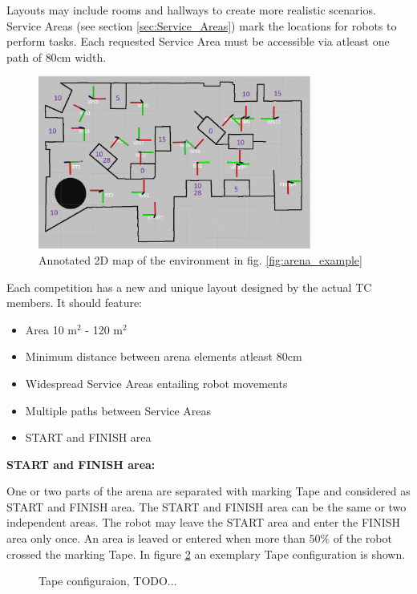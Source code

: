 Layouts may include rooms and hallways to create more realistic scenarios.
Service Areas (see section \ref{sec:Service_Areas}) mark the locations for robots to perform tasks.
Each requested Service Area must be accessible via atleast one path of $80\si{\centi\meter}$ width.

\begin{figure} [h!]
\centering
\includegraphics[width= 0.8\textwidth ]{./images/general_rules/arena_map_annotated}
\caption{Annotated 2D map of the environment in fig. \ref{fig:arena_example}}
\label{fig:arena_map_annotated}
\end{figure}

Each competition has a new and unique layout designed by the actual TC members.
It should feature:
\begin{itemize}
\item Area 10 m$^2$ - 120 m$^2$
\item Minimum distance between arena elements atleast $80\si{\centi\meter}$ 
\item Widespread Service Areas entailing robot movements
\item Multiple paths between Service Areas
\item START and FINISH area
\end{itemize}


\textbf{START and FINISH area:}
\label{subsubsec: Start and Goal Area}

One or two parts of the arena are separated with marking Tape and considered as START and FINISH area. The START and FINISH area can be the same or two independent areas. The robot may leave the START area and enter the FINISH area only once. An area is leaved or entered when more than $50\%$ of the robot crossed the marking Tape. In figure \ref{fig:tapeconfig} an exemplary Tape configuration is shown.

\begin{figure} [h!]
	\begin{center}
		\missingfigure[figwidth=6cm]{}	
	\end{center}
	\caption{Tape configuraion, TODO...}
	\label{fig:tapeconfig}
\end{figure}

